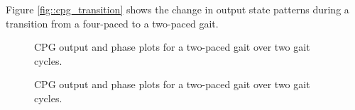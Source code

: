 Figure \ref{fig::cpg_transition} shows the change in output state patterns during a transition from a four-paced to a two-paced gait.	%
			\begin{figure}[h!]
				\centering
				\caption{CPG output and phase plots for a two-paced gait over two gait cycles.}
				\label{fig::cpg_phase2_45}
			\end{figure}
			\begin{figure}[h!]
				\centering
				\caption{CPG output and phase plots for a two-paced gait over two gait cycles.}
				\label{fig::cpg_phase4_45}
			\end{figure}
